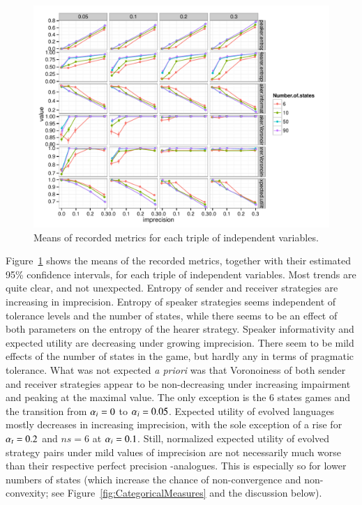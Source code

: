 \begin{figure}
  \centering
  
  \includegraphics[width=\textwidth]{plots/MeanMetrics.pdf}

  \caption{Means of recorded metrics for each triple of independent variables.}
  \label{fig:MeanMetrics}
\end{figure}

Figure~\ref{fig:MeanMetrics} shows the means of the recorded metrics,
together with their estimated 95\% confidence intervals, for each
triple of independent variables. Most trends are quite clear, and not
unexpected. Entropy of sender and receiver strategies are increasing
in imprecision. Entropy of speaker strategies seems independent of
tolerance levels and the number of states, while there seems to be an
effect of both parameters on the entropy of the hearer
strategy. Speaker informativity and expected utility are decreasing
under growing imprecision. There seem to be mild effects of the number
of states in the game, but hardly any in terms of pragmatic
tolerance. What was not expected \emph{a priori} was that Voronoiness
of both sender and receiver strategies appear to be non-decreasing
under increasing impairment and peaking at the maximal value. The only
exception is the 6 states games and the transition from $\alpha_i =
0$ to $\alpha_i = 0.05$. Expected utility of evolved languages
mostly decreases in increasing imprecision, with the sole exception of
a rise for $\alpha_t = 0.2$ and $ns = 6$ at $\alpha_i = 0.1$. Still,
normalized expected utility of evolved strategy pairs under mild
values of imprecision are not necessarily much worse than their
respective perfect precision \rd-analogues. This is especially so for
lower numbers of states (which increase the chance of non-convergence
and non-convexity; see Figure~\ref{fig:CategoricalMeasures} and the
discussion below).





